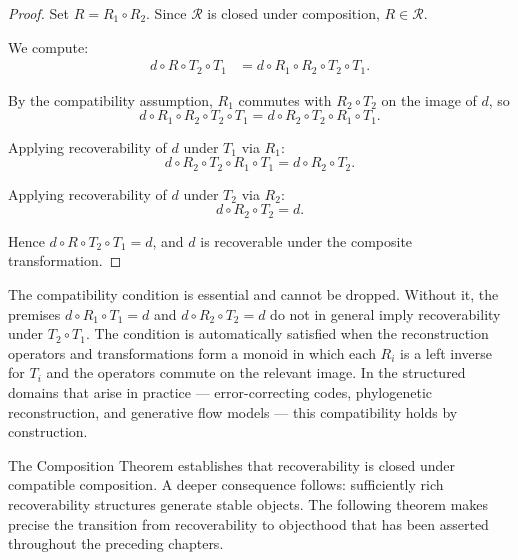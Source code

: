 \documentclass[12pt,oneside]{article}
\theoremstyle{definition}
\begin{document}
\begin{proof}

Set \(R = R_1 \circ R_2\). Since \(\mathcal{R}\) is closed under composition, \(R \in \mathcal{R}\).

We compute:
\begin{align*}
d \circ R \circ T_2 \circ T_1
&= d \circ R_1 \circ R_2 \circ T_2 \circ T_1.
\end{align*}

By the compatibility assumption, \(R_1\) commutes with \(R_2 \circ T_2\) on the image of \(d\), so
\[
d \circ R_1 \circ R_2 \circ T_2 \circ T_1
= d \circ R_2 \circ T_2 \circ R_1 \circ T_1.
\]

Applying recoverability of \(d\) under \(T_1\) via \(R_1\):
\[
d \circ R_2 \circ T_2 \circ R_1 \circ T_1
= d \circ R_2 \circ T_2.
\]

Applying recoverability of \(d\) under \(T_2\) via \(R_2\):
\[
d \circ R_2 \circ T_2 = d.
\]

Hence \(d \circ R \circ T_2 \circ T_1 = d\), and \(d\) is recoverable under the composite transformation.

\end{proof}

\begin{remark}

The compatibility condition is essential and cannot be dropped. Without it, the premises \(d \circ R_1 \circ T_1 = d\) and \(d \circ R_2 \circ T_2 = d\) do not in general imply recoverability under \(T_2 \circ T_1\). The condition is automatically satisfied when the reconstruction operators and transformations form a monoid in which each \(R_i\) is a left inverse for \(T_i\) and the operators commute on the relevant image. In the structured domains that arise in practice --- error-correcting codes, phylogenetic reconstruction, and generative flow models --- this compatibility holds by construction.

\end{remark}

The Composition Theorem establishes that recoverability is closed under compatible composition. A deeper consequence follows: sufficiently rich recoverability structures generate stable objects. The following theorem makes precise the transition from recoverability to objecthood that has been asserted throughout the preceding chapters.
\end{document}
